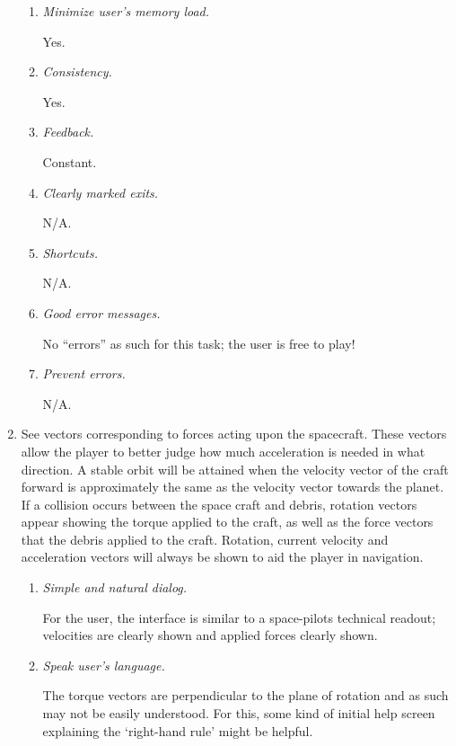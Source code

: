 \begin{enumerate}
\begin{enumerate}
  \item \emph{Minimize user's memory load.}

  Yes.
  
  \item \emph{Consistency.}

  Yes.
  
  \item \emph{Feedback.}

  Constant.
  
  \item \emph{Clearly marked exits.}

  N/A.
  
  \item \emph{Shortcuts.}

  N/A.
  
  \item \emph{Good error messages.}

  No ``errors'' as such for this task; the user is free to play!
  
  \item \emph{Prevent errors.}

  N/A.
 
\end{enumerate}

  \item See vectors corresponding to forces acting upon the spacecraft.  These vectors allow the player to better judge how much acceleration is needed in what direction.  A stable orbit will be attained when the velocity vector of the craft forward is approximately the same as the velocity vector towards the planet.  If a collision occurs between the space craft and debris, rotation vectors appear showing the torque applied to the craft, as well as the force vectors that the debris applied to the craft.  Rotation, current velocity and acceleration vectors will always be shown to aid the player in navigation.
\begin{enumerate}
  
  \item \emph{Simple and natural dialog.}

  For the user, the interface is similar to a space-pilots technical readout; velocities are clearly shown and applied forces clearly shown.
  
  \item \emph{Speak user's language.}

  The torque vectors are perpendicular to the plane of rotation and as such may not be easily understood.  For this, some kind of initial help screen explaining the `right-hand rule' might be helpful.
  

\end{enumerate}
\end{enumerate}
